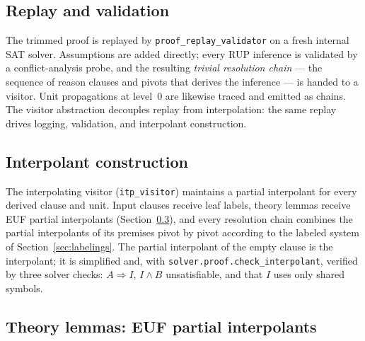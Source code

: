 \documentclass[11pt]{article}
\newcommand{\opt}[1]{\texttt{#1}}
\newcommand{\code}[1]{\texttt{#1}}
\begin{document}
\subsection{Replay and validation}

The trimmed proof is replayed by \code{proof\_replay\_validator} on a fresh
internal SAT solver. Assumptions are added directly; every RUP inference is
validated by a conflict-analysis probe, and the resulting \emph{trivial
resolution chain} --- the sequence of reason clauses and pivots that derives
the inference --- is handed to a visitor. Unit propagations at level~0 are
likewise traced and emitted as chains. The visitor abstraction decouples
replay from interpolation: the same replay drives logging, validation, and
interpolant construction.

\subsection{Interpolant construction}

The interpolating visitor (\code{itp\_visitor}) maintains a partial
interpolant for every derived clause and unit. Input clauses receive leaf
labels, theory lemmas receive EUF partial interpolants
(Section~\ref{sec:euf-leaf}), and every resolution chain combines the
partial interpolants of its premises pivot by pivot according to the labeled
system of Section~\ref{sec:labelings}. The partial interpolant of the empty
clause is the interpolant; it is simplified and, with
\opt{solver.proof.check\_interpolant}, verified by three solver checks:
$A \Rightarrow I$, $I \wedge B$ unsatisfiable, and that $I$ uses only shared
symbols.

\subsection{Theory lemmas: EUF partial interpolants}
\label{sec:euf-leaf}
\end{document}
